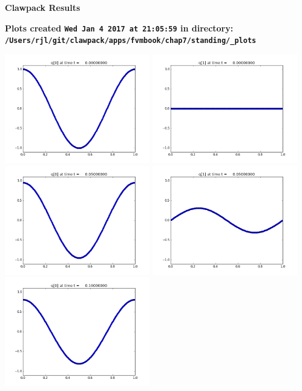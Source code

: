 \documentclass[11pt]{article}
\begin{document}
        \begin{center}{\Large\bf Clawpack Results}\vskip 5pt
        
        \bf Plots created {\tt Wed Jan  4 2017 at 21:05:59} in directory: \vskip 5pt
        \verb+/Users/rjl/git/clawpack/apps/fvmbook/chap7/standing/_plots+
        \end{center}
        \vskip 5pt
        \includegraphics[width=0.475\textwidth]{frame0000fig0.png}
\includegraphics[width=0.475\textwidth]{frame0000fig1.png}
\vskip 10pt 
\includegraphics[width=0.475\textwidth]{frame0001fig0.png}
\includegraphics[width=0.475\textwidth]{frame0001fig1.png}
\vskip 10pt 
\includegraphics[width=0.475\textwidth]{frame0002fig0.png}
\end{document}
